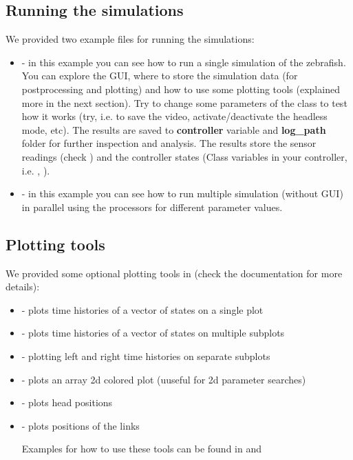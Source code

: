 \documentclass{cmc}
\begin{document}
\subsection*{Running the simulations}\label{subsec:simulating}
We provided two example files for running the simulations:
\begin{itemize}
\item {} - in this example you can see how to run a single simulation of the zebrafish. You can explore the GUI, where to store the simulation data (for postprocessing and plotting) and how to use some plotting tools (explained more in the next section).
Try to change some parameters of the  class to test how it works (try, i.e. to save the video, activate/deactivate the headless mode, etc). The results are saved to \textbf{controller} variable and \textbf{log\_path} folder for further inspection and analysis. The results store the sensor readings (check ) and the controller states (Class variables in your controller, i.e. , ).



\item {} - in this example you can see how to run multiple simulation (without GUI) in parallel using the processors for different parameter values.
\end{itemize}


\subsection*{Plotting tools}\label{subsec:plotting}
We provided some optional plotting tools in  (check the documentation for more details):
\begin{itemize}
\item {} - plots time histories of a vector of states on a single plot
\item {} - plots time histories of a vector of states on multiple subplots
\item {} - plotting left and right time histories on separate subplots
\item {} - plots an array 2d colored plot (uuseful for 2d parameter searches)
\item {} - plots head positions
\item {} - plots positions of the links

Examples for how to use these tools can be found in  and 

\end{itemize}
\end{document}
